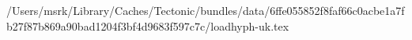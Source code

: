 /Users/msrk/Library/Caches/Tectonic/bundles/data/6ffe055852f8faf66c0acbe1a7fb27f87b869a90bad1204f3bf4d9683f597c7c/loadhyph-uk.tex